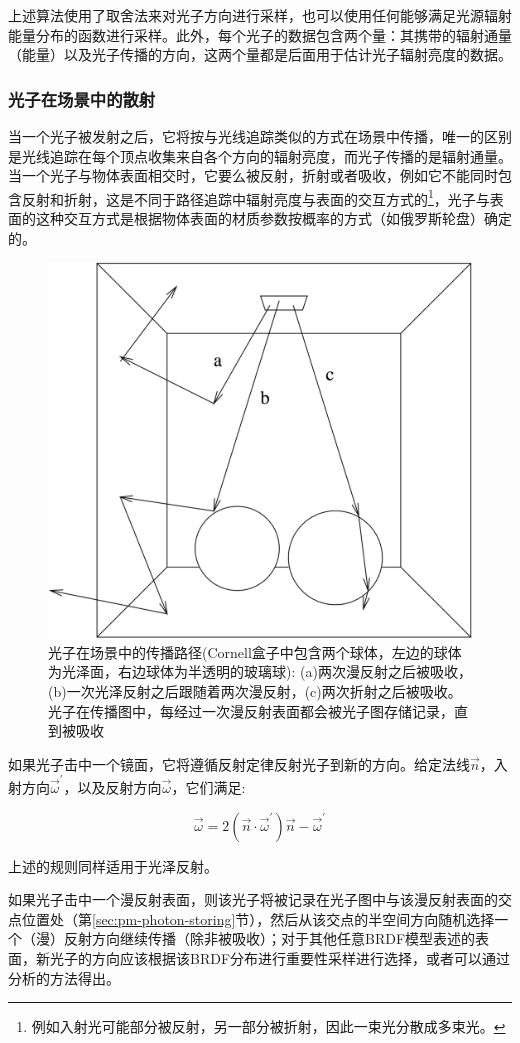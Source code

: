 上述算法使用了取舍法来对光子方向进行采样，也可以使用任何能够满足光源辐射能量分布的函数进行采样。此外，每个光子的数据包含两个量：其携带的辐射通量（能量）以及光子传播的方向，这两个量都是后面用于估计光子辐射亮度的数据。





\subsubsection{光子在场景中的散射}
当一个光子被发射之后，它将按与光线追踪类似的方式在场景中传播，唯一的区别是光线追踪在每个顶点收集来自各个方向的辐射亮度，而光子传播的是辐射通量。当一个光子与物体表面相交时，它要么被反射，折射或者吸收，例如它不能同时包含反射和折射，这是不同于路径追踪中辐射亮度与表面的交互方式的\footnote{例如入射光可能部分被反射，另一部分被折射，因此一束光分散成多束光。}，光子与表面的这种交互方式是根据物体表面的材质参数按概率的方式（如俄罗斯轮盘）确定的。

\begin{figure}
\sidecaption
	\includegraphics[width=.5\textwidth]{figures/pm/pm-4}
	\caption{光子在场景中的传播路径(Cornell盒子中包含两个球体，左边的球体为光泽面，右边球体为半透明的玻璃球): (a)两次漫反射之后被吸收，(b)一次光泽反射之后跟随着两次漫反射，(c)两次折射之后被吸收。光子在传播图中，每经过一次漫反射表面都会被光子图存储记录，直到被吸收}
\end{figure}

如果光子击中一个镜面，它将遵循反射定律反射光子到新的方向。给定法线$\vec{n}$，入射方向$\vec{\omega}^{'}$，以及反射方向$\vec{\omega}$，它们满足:

\begin{equation}
	\vec{\omega}=2(\vec{n}\cdot\vec{\omega}^{'})\vec{n}-\vec{\omega}^{'}
\end{equation}

\noindent 上述的规则同样适用于光泽反射。

如果光子击中一个漫反射表面，则该光子将被记录在光子图中与该漫反射表面的交点位置处（第\ref{sec:pm-photon-storing}节），然后从该交点的半空间方向随机选择一个（漫）反射方向继续传播（除非被吸收）；对于其他任意BRDF模型表述的表面，新光子的方向应该根据该BRDF分布进行重要性采样进行选择，或者可以通过分析的方法得出。

